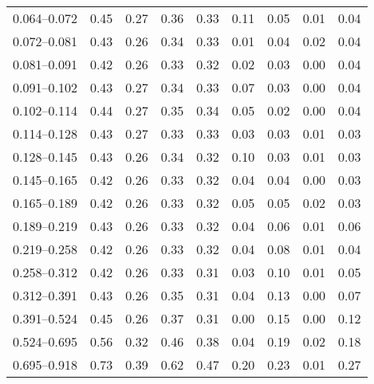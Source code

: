 \begin{table}
\begin{center}
{\begin{tabular}{@{}l l l l l l l l l@{}}
                0.064--0.072    &  0.45   &  0.27   &  0.36         &  0.33      &  0.11    &  0.05  &  0.01       &  0.04  \\
                0.072--0.081    &  0.43   &  0.26   &  0.34         &  0.33      &  0.01    &  0.04  &  0.02       &  0.04  \\
                0.081--0.091    &  0.42   &  0.26   &  0.33         &  0.32      &  0.02    &  0.03  &  0.00       &  0.04  \\
                0.091--0.102    &  0.43   &  0.27   &  0.34         &  0.33      &  0.07    &  0.03  &  0.00       &  0.04  \\
                0.102--0.114    &  0.44   &  0.27   &  0.35         &  0.34      &  0.05    &  0.02  &  0.00       &  0.04  \\
                0.114--0.128    &  0.43   &  0.27   &  0.33         &  0.33      &  0.03    &  0.03  &  0.01       &  0.03  \\
                0.128--0.145    &  0.43   &  0.26   &  0.34         &  0.32      &  0.10    &  0.03  &  0.01       &  0.03  \\
                0.145--0.165    &  0.42   &  0.26   &  0.33         &  0.32      &  0.04    &  0.04  &  0.00       &  0.03  \\
                0.165--0.189    &  0.42   &  0.26   &  0.33         &  0.32      &  0.05    &  0.05  &  0.02       &  0.03  \\
                0.189--0.219    &  0.43   &  0.26   &  0.33         &  0.32      &  0.04    &  0.06  &  0.01       &  0.06  \\
                0.219--0.258    &  0.42   &  0.26   &  0.33         &  0.32      &  0.04    &  0.08  &  0.01       &  0.04  \\
                0.258--0.312    &  0.42   &  0.26   &  0.33         &  0.31      &  0.03    &  0.10  &  0.01       &  0.05  \\
                0.312--0.391    &  0.43   &  0.26   &  0.35         &  0.31      &  0.04    &  0.13  &  0.00       &  0.07  \\
                0.391--0.524    &  0.45   &  0.26   &  0.37         &  0.31      &  0.00    &  0.15  &  0.00       &  0.12  \\
                0.524--0.695    &  0.56   &  0.32   &  0.46         &  0.38      &  0.04    &  0.19  &  0.02       &  0.18  \\
                0.695--0.918    &  0.73   &  0.39   &  0.62         &  0.47      &  0.20    &  0.23  &  0.01       &  0.27  \\

\end{tabular}}
\end{center}
\end{table}
